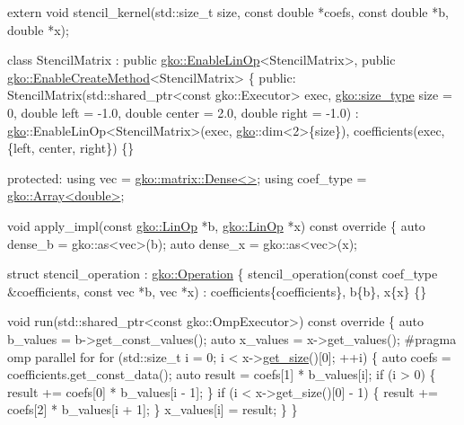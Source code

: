 \begin{DoxyCodeInclude}
\textcolor{keyword}{extern} \textcolor{keywordtype}{void} stencil\_kernel(std::size\_t size, \textcolor{keyword}{const} \textcolor{keywordtype}{double} *coefs,
                           \textcolor{keyword}{const} \textcolor{keywordtype}{double} *b, \textcolor{keywordtype}{double} *x);


\textcolor{keyword}{class }StencilMatrix : \textcolor{keyword}{public} \hyperlink{classgko_1_1EnableLinOp}{gko::EnableLinOp}<StencilMatrix>,
                      \textcolor{keyword}{public} \hyperlink{classgko_1_1EnableCreateMethod}{gko::EnableCreateMethod}<StencilMatrix> \{
\textcolor{keyword}{public}:
    StencilMatrix(std::shared\_ptr<const gko::Executor> exec,
                  \hyperlink{namespacegko_a6e5c95df0ae4e47aab2f604a22d98ee7}{gko::size\_type} size = 0, \textcolor{keywordtype}{double} left = -1.0,
                  \textcolor{keywordtype}{double} center = 2.0, \textcolor{keywordtype}{double} right = -1.0)
        : \hyperlink{namespacegko}{gko}::EnableLinOp<StencilMatrix>(exec, \hyperlink{namespacegko}{gko}::dim<2>\{size\}),
          coefficients(exec, \{left, center, right\})
    \{\}

\textcolor{keyword}{protected}:
    \textcolor{keyword}{using} vec = \hyperlink{classgko_1_1matrix_1_1Dense}{gko::matrix::Dense<>};
    \textcolor{keyword}{using} coef\_type = \hyperlink{classgko_1_1Array}{gko::Array<double>};

    \textcolor{keywordtype}{void} apply\_impl(\textcolor{keyword}{const} \hyperlink{classgko_1_1LinOp}{gko::LinOp} *b, \hyperlink{classgko_1_1LinOp}{gko::LinOp} *x)\textcolor{keyword}{ const override}
\textcolor{keyword}{    }\{
        \textcolor{keyword}{auto} dense\_b = gko::as<vec>(b);
        \textcolor{keyword}{auto} dense\_x = gko::as<vec>(x);

        \textcolor{keyword}{struct }stencil\_operation : \hyperlink{classgko_1_1Operation}{gko::Operation} \{
            stencil\_operation(\textcolor{keyword}{const} coef\_type &coefficients, \textcolor{keyword}{const} vec *b,
                              vec *x)
                : coefficients\{coefficients\}, b\{b\}, x\{x\}
            \{\}

            \textcolor{keywordtype}{void} run(std::shared\_ptr<const gko::OmpExecutor>)\textcolor{keyword}{ const override}
\textcolor{keyword}{            }\{
                \textcolor{keyword}{auto} b\_values = b->get\_const\_values();
                \textcolor{keyword}{auto} x\_values = x->get\_values();
\textcolor{preprocessor}{#pragma omp parallel for}
                \textcolor{keywordflow}{for} (std::size\_t i = 0; i < x->\hyperlink{classgko_1_1LinOp_a31b3c003388eb0b95393154f68c2b98d}{get\_size}()[0]; ++i) \{
                    \textcolor{keyword}{auto} coefs = coefficients.get\_const\_data();
                    \textcolor{keyword}{auto} result = coefs[1] * b\_values[i];
                    \textcolor{keywordflow}{if} (i > 0) \{
                        result += coefs[0] * b\_values[i - 1];
                    \}
                    \textcolor{keywordflow}{if} (i < x->get\_size()[0] - 1) \{
                        result += coefs[2] * b\_values[i + 1];
                    \}
                    x\_values[i] = result;
                \}
            \}


\end{DoxyCodeInclude}
